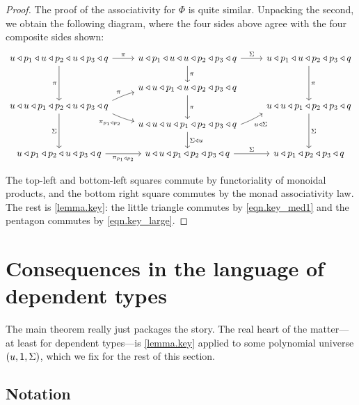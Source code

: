 \documentclass[11pt, one side, article]{memoir}
\theoremstyle{definition}
\theoremstyle{plain}
\newcommand{\0}{\textsf{0}}
\newcommand{\1}{\tn{\textsf{1}}}
\newcommand{\tri}{\mathbin{\triangleleft}}
\newcommand{\switch}{\pi}
\begin{document}
\begin{proof}
The proof of the associativity for $\Phi$ is quite similar. Unpacking the second, we obtain the following diagram, where the four sides above agree with the four composite sides shown:%
\[%
\begin{tikzcd}
	u\tri p_1\tri u\tri p_2\tri u\tri p_3\tri q\ar[r, "\switch"]\ar[dd, "\switch"']&
	u\tri p_1\tri u\tri u\tri p_2\tri p_3\tri q\ar[r, "\Sigma"]\ar[d, "\switch"]&
	u\tri p_1\tri u\tri p_2\tri p_3\tri q\ar[dd, "\switch"]\\&
	u\tri u\tri p_1\tri u\tri p_2\tri p_3\tri q\ar[dd, "\switch"]\\[-12pt]
	u\tri u\tri p_1\tri p_2\tri u\tri p_3\tri q\ar[dd, "\Sigma"']\ar[ur, bend left=5pt, start anchor={north east}, "\switch"]\ar[dr, bend right=5pt, start anchor={south east}, "\switch_{p_1\tri p_2}"']&&
	u\tri u\tri p_1\tri p_2\tri p_3\tri q\ar[dd, "\Sigma"]\\[-12pt]&
	u\tri u\tri u\tri p_1\tri p_2\tri p_3\tri q\ar[d, "\Sigma\tri u"]\ar[ur, bend right=5pt, start anchor={east}, end anchor={south west}, "u\tri\Sigma"']\\
	u\tri p_1\tri p_2\tri u\tri p_3\tri q\ar[r, "\switch_{p_1\tri p_2}"']&
	u\tri u\tri p_1\tri p_2\tri p_3\tri q\ar[r, "\Sigma"]&
	u\tri p_1\tri p_2\tri p_3\tri q
\end{tikzcd}
\]




The top-left and bottom-left squares commute by functoriality of monoidal products, and the bottom right square commutes by the monad associativity law. The rest is \cref{lemma.key}: the little triangle commutes by \eqref{eqn.key_med1} and the pentagon commutes by \eqref{eqn.key_large}.
\end{proof}


\chapter{Consequences in the language of dependent types}

The main theorem really just packages the story. The real heart of the matter---at least for dependent types---is \cref{lemma.key} applied to some  polynomial universe $(u,\1,\Sigma)$, which we fix for the rest of this section.

\section{Notation}
\end{document}
